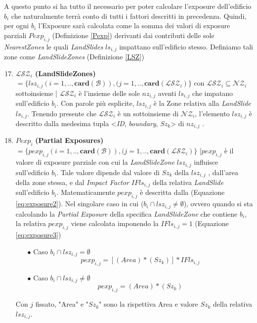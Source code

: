 \newpage 
A questo punto si ha tutto il necessario per poter calcolare l'exposure dell'edificio $b_i$ che naturalmente terrà conto di tutti i fattori descritti in precedenza. Quindi, per ogni $b_i$ l'Exposure sarà calcolata come la somma dei valori di exposure parziali $Pexp_{i,j}$ (Definizione \ref{Pexp}) derivanti dai contributi delle sole \textit{NearestZones} le quali \textit{LandSlides} $ls_{i,j}$ impattano sull'edificio stesso.
Definiamo tali zone come \textit{LandSlideZones} (Definizione \ref{LSZ})

\begin{enumerate}
	\setcounter{enumi}{16}

	\item \label{LSZ} \textbf{$ \mathcal{LSZ}_i $ (LandSlideZones)} $ = \{lsz_{i,j}(i=1,..,\mathbf{card}(\mathcal{B})),(j=1,..,\mathbf{card}(\mathcal{LSZ}_i)\}$ con $\mathcal{LSZ}_i \subseteq \mathcal{NZ}_i$  sottoinsieme | $\mathcal{LSZ}_i$ 
	è l'insieme delle sole $nz_{i,j}$ aventi $ls_{i,j}$ che impatano sull'edificio $b_i$. 
	Con parole più esplicite, $lsz_{i,j}$ è la Zone relativa alla \textit{LandSlide} $ls_{i,j}$. 
	Tenendo presente che $\mathcal{LSZ}_i$ è un sottoinsieme di $\mathcal{NZ}_i$, l'elemento $lsz_{i,j}$  è descritto dalla medesima tupla <\textit{ID}, \textit{boundary}, \textit{$Sz_k$}> di $nz_{i,j}$ . 
	
	\item \label{Pexp} $Pexp_i$ \textbf{(Partial Exposures)} $ = \{pexp_{i,j}(i=1,..,\mathbf{card}(\mathcal{B})),(j=1,..,\mathbf{card}(\mathcal{LSZ}_i)\}$ |$pexp_{i,j}$ è il valore di exposure parziale con cui la \textit{LandSlideZone} $lsz_{i,j}$ influisce sull'edificio $b_i$. Tale valore dipende dal valore di $Sz_k$ della $lsz_{i,j}$ , dall'area della zone stessa, e dal \textit{Impact Factor} $IFls_{i,j}$ della relativa \textit{LandSlide} sull'edificio $b_i$. Matematicamente $pexp_{i,j}$ è descritta dalla (Equazione \ref{eq:exposure2}). Nel singolare caso in cui ($b_i \cap lsz_{i,j} \not=\emptyset$), ovvero quando si sta calcolando la  \textit{Partial Exposure} della specifica \textit{LandSlideZone} che contiene $b_i$, la relativa $pexp_{i,j}$ viene calcolata imponendo la $IFls_{i,j}=1$ (Equazione \ref{eq:exposure3})  
	\\
	\begin{enumerate}
		\item[$\bullet$] Caso $b_i \cap lsz_{i,j}=\emptyset$
		\begin{equation}\label{eq:exposure2}
		pexp_{i,j} =[(Area)*(Sz_{k})] * IFls_{i,j}
		\end{equation}
		
		\item[$\bullet$] Caso $b_i \cap lsz_{i,j} \not=\emptyset$
		\begin{equation}\label{eq:exposure3}
		pexp_{i,j} =(Area)*(Sz_{k})
		\end{equation}
	\end{enumerate}

	{Con $j$ fissato, "Area" e "$Sz_k$" sono la rispettiva Area e valore $Sz_k$ della relativa $lsz_{i,j}$.}
	
\end{enumerate}

